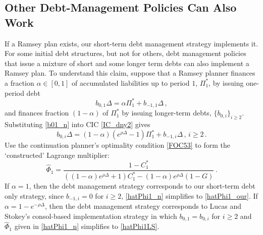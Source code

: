 \documentclass[12pt]{article}
\begin{document}
\subsection{Other Debt-Management Policies Can Also Work}\label{sec:otherpolicies}
If a Ramsey plan exists, our  short-term debt management strategy  implements  it. %
 For some initial debt structures,  but not for others,   debt management policies that issue a mixture of  short and some  longer term debts can also implement a Ramsey plan. 
To understand this claim,  suppose that a Ramsey planner  finances a fraction $\alpha\in [0, 1]$ of accumulated  liabilities  up to period $1$, $\Pi_1^*$, by issuing one-period debt %
\begin{equation} \label{b01_n}
	b_{0, 1}\Delta = \alpha \Pi_1^*+b_{-1, 1}\Delta\, , 
\end{equation}
  and  finances   fraction $(1-\alpha)$ of $\Pi_1^*$ by issuing longer-term debts, $\{b_{0, i}\}_{i\geq 2}$. Substituting \eqref{b01_n} into  CIC \eqref{IC_dny2} gives 
  \begin{equation} \label{b02_n}
	b_{0, i}\Delta = (1-\alpha)(e^{\rho\Delta}-1)\Pi_1^*+b_{-1, i}\Delta\,,\,  i\geq 2\,.
\end{equation} 
Use  the continuation planner's optimality condition \eqref{FOC53} to form the  `constructed' Lagrange multiplier: 
\begin{equation} \label{hatPhi1_n}
	\widehat{\Phi}_1 = \frac{1-C_1^*}{((1-\alpha)e^{\rho\Delta}+1)C_1^*-(1-\alpha)e^{\rho\Delta}(1-G)} \,.
\end{equation}
If $\alpha = 1$, then the debt management   strategy corresponds to our  short-term debt only strategy, %
 since $b_{-1,i} = 0$ for $i \geq 2$,  \eqref{hatPhi1_n} simplifies  to \eqref{hatPhi1_our}. 
If  $\alpha = 1 - e^{-\rho \Delta}$, then the debt management   strategy corresponds to  Lucas and Stokey's consol-based implementation strategy in which $b_{0,1} = b_{0,i}$ for $i \geq 2$ and $\widehat{\Phi}_1$ given in \eqref{hatPhi1_n} simplifies to  \eqref{hatPhi1LS}. 
\end{document}
